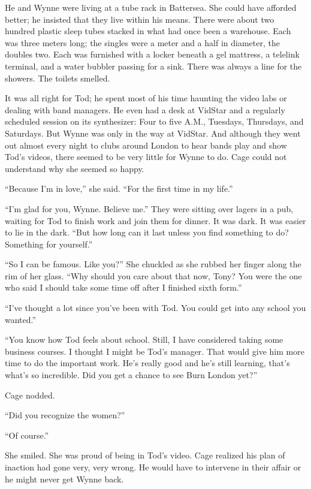 He and Wynne were living at a tube rack in Battersea. She could have afforded better; he insisted that they live within his means. There were about two hundred plastic sleep tubes stacked in what had once been a warehouse. Each was three meters long; the singles were a meter and a half in diameter, the doubles two. Each was furnished with a locker beneath a gel mattress, a telelink terminal, and a water bubbler passing for a sink. There was always a line for the showers. The toilets smelled.

It was all right for Tod; he spent most of his time haunting the video labs or dealing with band managers. He even had a desk at VidStar and a regularly scheduled session on its synthesizer: Four to five A.M., Tuesdays, Thursdays, and Saturdays. But Wynne was only in the way at VidStar. And although they went out almost every night to clubs around London to hear bands play and show Tod’s videos, there seemed to be very little for Wynne to do. Cage could not understand why she seemed so happy.

“Because I’m in love,” she said. “For the first time in my life.”

“I’m glad for you, Wynne. Believe me.” They were sitting over lagers in a pub, waiting for Tod to finish work and join them for dinner. It was dark. It was easier to lie in the dark. “But how long can it last unless you find something to do? Something for yourself.”

“So I can be famous. Like you?” She chuckled as she rubbed her finger along the rim of her glass. “Why should you care about that now, Tony? You were the one who said I should take some time off after I finished sixth form.”

“I’ve thought a lot since you’ve been with Tod. You could get into any school you wanted.”

“You know how Tod feels about school. Still, I have considered taking some business courses. I thought I might be Tod’s manager. That would give him more time to do the important work. He’s really good and he’s still learning, that’s what’s so incredible. Did you get a chance to see Burn London yet?”

Cage nodded.

“Did you recognize the women?”

“Of course.”

She smiled. She was proud of being in Tod’s video. Cage realized his plan of inaction had gone very, very wrong. He would have to intervene in their affair or he might never get Wynne back.

